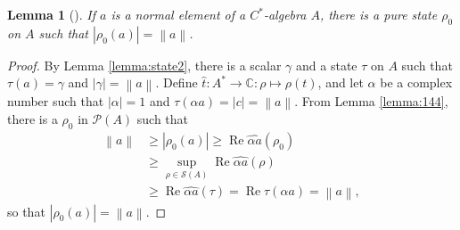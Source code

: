 \documentclass[11pt,a4paper]{report}
\theoremstyle{plain}
\newtheorem{lemma}{Lemma}
\theoremstyle{definition}
\newcommand{\1}{\mathbbm{1}}
\newcommand{\C}{\mathbb{C}}
\renewcommand{\S}{\mathscr{S}}
\renewcommand{\P}[1]{\mathscr{P}(#1)}
\DeclareMathOperator{\Real}{\operatorname{Re}}
\begin{document}
\begin{lemma}[{\cite[4.3.8,(iv)]{kadison83}}]\label{lemma:pure2}
	If $a$ is a normal element of a $C^\ast$-algebra $A$, there is a pure state 
	$\rho_0$ on $A$ such that $|\rho_0(a)|=\left\|a\right\|$.
\end{lemma}
\begin{proof}
	By Lemma \ref{lemma:state2}, there is a scalar $\gamma$ and a state $\tau$ on 
	$A$ such that $\tau(a)=\gamma$ and $|\gamma|=\left\|a\right\|$. Define $\hat t 
	:A^\ast\to\C:\rho \mapsto\rho(t)$, and let $\alpha$ be a complex number such 
	that $|\alpha|=1$ and $\tau(\alpha a) = |c| = \left\|a\right\|$. From Lemma 
	\ref{lemma:144}, there is a $\rho_0$ in $\P A$ such that 
	\begin{align*}
				\left\|a\right\|
		&\geq 	|\rho_0(a)| \geq \Real \widehat {\alpha a}(\rho_0)							\\
		&\geq 	\sup_{\rho\in \S(A)} \Real\widehat {\alpha a}(\rho) 						\\
		&\geq	\Real\widehat {\alpha a}(\tau) 
				= \Real\tau(\alpha a) = \left\|a\right\|,
	\end{align*}
	so that $|\rho_0(a)|=\left\|a\right\|$.
\end{proof}
\end{document}
